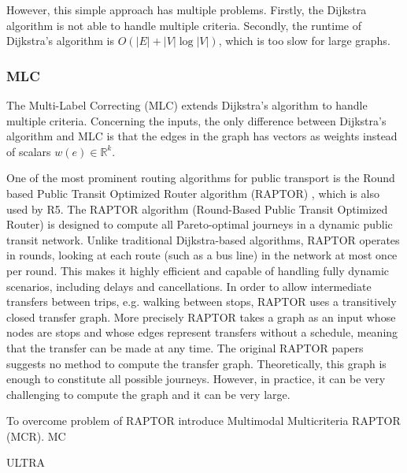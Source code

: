 However, this simple approach has multiple problems. Firstly, the Dijkstra
algorithm is not able to handle multiple criteria. Secondly, the runtime of
Dijkstra's algorithm is \( O(|E| + |V| \log |V|) \), which is too slow for
large graphs.

\subsubsection{MLC}
\label{subsubsec:mlc}

The Multi-Label Correcting (MLC) 
extends Dijkstra's algorithm to handle multiple criteria. Concerning the inputs,
the only difference between Dijkstra's algorithm and MLC is that the edges in
the graph has vectors as weights instead of scalars \( w(e) \in \mathbb{R}^k \).




One of the most prominent routing algorithms for public transport is the Round
based Public Transit Optimized Router algorithm (RAPTOR)
\cite{dellingRoundBasedPublicTransit2015}, which is also used by R5. The RAPTOR
algorithm (Round-Based Public Transit Optimized Router) is designed to compute
all Pareto-optimal journeys in a dynamic public transit network. Unlike
traditional Dijkstra-based algorithms, RAPTOR operates in rounds, looking at
each route (such as a bus line) in the network at most once per round. This
makes it highly efficient and capable of handling fully dynamic scenarios,
including delays and cancellations.
In order to allow intermediate transfers between trips, e.g. walking between
stops, RAPTOR uses a transitively closed transfer graph. More precisely RAPTOR
takes a graph as an input whose nodes are stops and whose edges represent
transfers without a schedule, meaning that the transfer can be made at any time.
The original RAPTOR papers suggests no method to compute the transfer graph.
Theoretically, this graph is enough to constitute all possible journeys.
However, in practice, it can be very challenging to compute the graph and it
can be very large.

To overcome problem of RAPTOR \cite{dellingComputingMultimodalJourneys2013}
introduce Multimodal Multicriteria RAPTOR (MCR). MC

ULTRA
